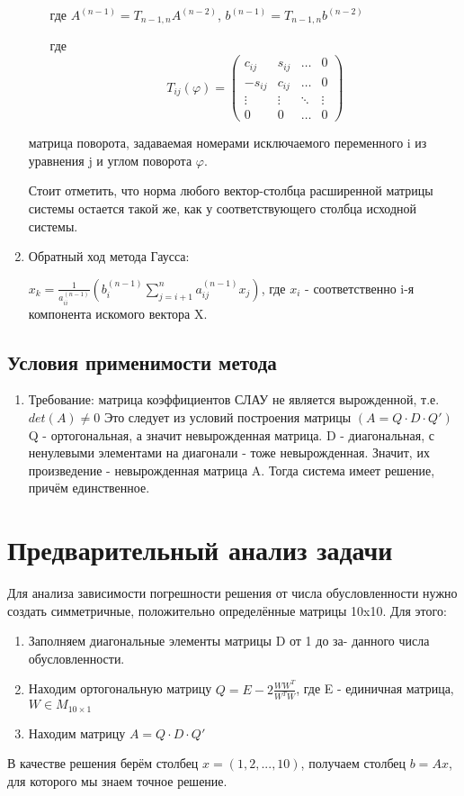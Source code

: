 \documentclass{article}
\begin{document}
\begin{enumerate}
\begin{enumerate}
			где	$A^{(n-1)} = T_{n-1,n}A^{(n-2)}$, $b^{(n-1)} = T_{n-1,n}b^{(n-2)}$
				
				где \begin{equation*}
					T_{ij}(\varphi) = \left(
					\begin{array}{cccc}
						c_{ij} & s_{ij} & \ldots & 0\\
						-s_{ij} & c_{ij} & \ldots & 0\\
						\vdots & \vdots & \ddots & \vdots\\
						0 & 0 & \ldots & 0
					\end{array}
					\right)
				\end{equation*}
				
			\end{enumerate}	
		матрица поворота, задаваемая номерами исключаемого переменного i из уравнения j и углом
		поворота $\varphi$.
		
		Стоит отметить, что норма любого вектор-столбца расширенной матрицы системы остается
		такой же, как у соответствующего столбца исходной системы.
			\item Обратный ход метода Гаусса:
			
			$x_k = \frac{1}{a^{(n-1)}_{ii}}(b^{(n-1)}_i\sum\limits_{j=i+1}^{n}{a^{(n-1)}_{ij}x_j})$, где $x_i$ - соответственно i-я компонента искомого вектора X.
		\end{enumerate}
		
	\subsection{Условия применимости метода}
	\begin{enumerate}
		\item Требование: матрица коэффициентов СЛАУ не является вырожденной, т.е. $det(A) \neq 0$
		Это следует из условий построения матрицы $(A =Q \cdot D \cdot Q')$
		Q - ортогональная, а значит невырожденная матрица.
		D - диагональная, с ненулевыми элементами на диагонали - тоже невырожденная.
		Значит, их произведение - невырожденная матрица A.
		Тогда система имеет решение, причём единственное.
	\end{enumerate}
	\section{Предварительный анализ задачи}
	Для анализа зависимости погрешности решения от числа обусловленности нужно создать симметричные, положительно определённые матрицы 10x10. Для этого:
	\begin{enumerate}
		\item Заполняем диагональные элементы матрицы D от 1 до за-
		данного числа обусловленности.
		\item Находим ортогональную матрицу $Q = E - 2\frac{WW^T}{W^TW}$, где E - единичная матрица, $W \in M_{10 \times 1}$
		\item Находим матрицу $A = Q \cdot D \cdot Q'$
	\end{enumerate}
	В качестве решения берём столбец $x = (1,2,...,10)$, получаем столбец $b = Ax$, для которого мы знаем точное решение.
	
\end{document}
